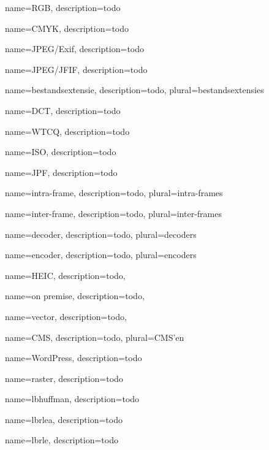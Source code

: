 {
	name={RGB},
	description={todo}
}

{
	name={CMYK},
	description={todo}
}

{
	name={JPEG/Exif},
	description={todo}
}

{
	name={JPEG/JFIF},
	description={todo}
}

{
	name={bestandsextensie},
	description={todo},
	plural={bestandsextensies}
}

{
	name={DCT},
	description={todo}
}

{
	name={WTCQ},
	description={todo}
}

{
	name={ISO},
	description={todo}
}

{
	name={JPF},
	description={todo}
}

{
	name={intra-frame},
	description={todo},
	plural={intra-frames}
}

{
	name={inter-frame},
	description={todo},
	plural={inter-frames}
}

{
	name={decoder},
	description={todo},
	plural={decoders}
}

{
	name={encoder},
	description={todo},
	plural={encoders}
}

{
	name={HEIC},
	description={todo},
}

{
	name={on premise},
	description={todo},
}

{
	name={vector},
	description={todo},
}

{
	name={CMS},
	description={todo},
	plural={CMS'en}
}

{
	name={WordPress},
	description={todo}
}

{
	name={raster},
	description={todo}
}

{
	name={lbhuffman},
	description={todo}
}

{
	name={lbrlea},
	description={todo}
}

{
	name={lbrle},
	description={todo}
}

